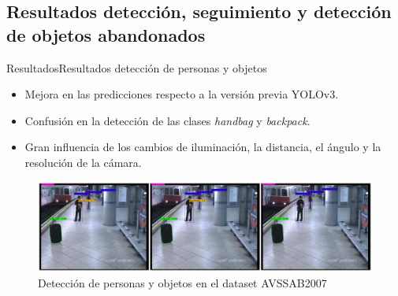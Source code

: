 
\subsection{Resultados detección, seguimiento y detección de objetos abandonados}

\begin{frame}{Resultados}{Resultados detección de personas y objetos}

\begin{itemize}
    \justifying
    \item Mejora en las predicciones respecto a la versión previa YOLOv3.
    \item Confusión en la detección de las clases \textit{handbag} y \textit{backpack}.
    \item Gran influencia de los cambios de iluminación, la distancia, el ángulo y la resolución de la cámara.
\end{itemize}

\begin{figure}[ht]
\centering
\includegraphics[width=1\textwidth]{Images/resultados/evaluacion-algoritmos/avss-easy-detection-example.jpg}
\caption{\label{fig:avss-easy-detection-example}Detección de personas y objetos en el dataset AVSSAB2007}
\end{figure}

\end{frame}


